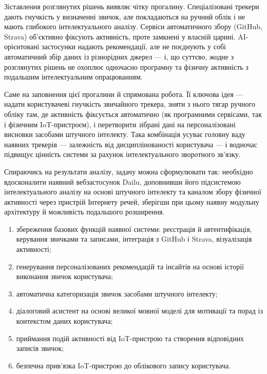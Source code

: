 
Зіставлення розглянутих рішень виявляє чітку прогалину.
Спеціалізовані трекери дають гнучкість у визначенні звичок, але покладаються на ручний облік і
не мають глибокого інтелектуального аналізу.
Сервіси автоматичного збору (GitHub, Strava) об'єктивно фіксують активність, проте замкнені у
власній царині.
AI-орієнтовані застосунки надають рекомендації, але не поєднують у собі автоматичний збір даних
із різнорідних джерел — і, що суттєво, жодне з розглянутих рішень не охоплює одночасно
програмну та фізичну активність з подальшим інтелектуальним опрацюванням.

Саме на заповнення цієї прогалини й спрямована робота.
Її ключова ідея — надати користувачеві гнучкість звичайного трекера, зняти з нього тягар
ручного обліку там, де активність фіксується автоматично (як програмними сервісами, так і
фізичним IoT-пристроєм), і перетворити зібрані дані на персоналізовані висновки засобами
штучного інтелекту.
Така комбінація усуває головну ваду наявних трекерів — залежність від дисциплінованості
користувача — і водночас підвищує цінність системи за рахунок інтелектуального зворотного
зв'язку.


Спираючись на результати аналізу, задачу можна сформулювати так: необхідно вдосконалити наявний
вебзастосунок Dailu, доповнивши його підсистемою інтелектуального аналізу на основі штучного
інтелекту та каналом збору фізичної активності через пристрій Інтернету речей, зберігши при
цьому наявну модульну архітектуру й можливість подальшого розширення.


\begin{enumerate}[noitemsep, topsep=2pt, leftmargin=*, label=\arabic*)]
    \item збереження базових функцій наявної системи: реєстрація й автентифікація, керування звичками та записами, інтеграція з GitHub і Strava, візуалізація активності;
    \item генерування персоналізованих рекомендацій та інсайтів на основі історії виконання звичок користувача;
    \item автоматична категоризація звичок засобами штучного інтелекту;
    \item діалоговий асистент на основі великої мовної моделі для мотивації та порад із контекстом даних користувача;
    \item приймання подій активності від IoT-пристрою та створення відповідних записів звичок;
    \item безпечна прив'язка IoT-пристрою до облікового запису користувача.
\end{enumerate}

